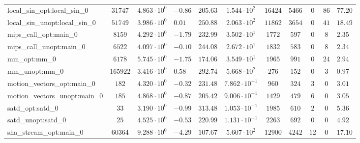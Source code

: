 \begin{tabular}{|l|c|HHc|c|c|c|c|cH|}
local\_sin\_opt:local\_sin\_0                   & $ 31747    $ & $ 4.863 \cdot 10^{0} $ & $ -0.86 $ & $ 205.63 $ & $ 1.544 \cdot 10^{2}  $ & $ 16424  $ & $ 5466  $ & $ 0   $ & $ 86  $ & $ 77.20   $ \\
local\_sin\_unopt:local\_sin\_0                 & $ 51749    $ & $ 3.986 \cdot 10^{0} $ & $ 0.01  $ & $ 250.88 $ & $ 2.063 \cdot 10^{2}  $ & $ 11862  $ & $ 3654  $ & $ 0   $ & $ 41  $ & $ 18.49   $ \\
mips\_call\_opt:main\_0                         & $ 8159     $ & $ 4.292 \cdot 10^{0} $ & $ -1.79 $ & $ 232.99 $ & $ 3.502 \cdot 10^{1}  $ & $ 1772   $ & $ 597   $ & $ 0   $ & $ 8   $ & $ 2.35    $ \\
mips\_call\_unopt:main\_0                       & $ 6522     $ & $ 4.097 \cdot 10^{0} $ & $ -0.10 $ & $ 244.08 $ & $ 2.672 \cdot 10^{1}  $ & $ 1832   $ & $ 583   $ & $ 0   $ & $ 8   $ & $ 2.34    $ \\
mm\_opt:mm\_0                                   & $ 6178     $ & $ 5.745 \cdot 10^{0} $ & $ -1.75 $ & $ 174.06 $ & $ 3.549 \cdot 10^{1}  $ & $ 1965   $ & $ 991   $ & $ 0   $ & $ 24  $ & $ 2.94    $ \\
mm\_unopt:mm\_0                                 & $ 165922   $ & $ 3.416 \cdot 10^{0} $ & $ 0.58  $ & $ 292.74 $ & $ 5.668 \cdot 10^{2}  $ & $ 276    $ & $ 152   $ & $ 0   $ & $ 3   $ & $ 0.97    $ \\
motion\_vectors\_opt:main\_0                    & $ 182      $ & $ 4.320 \cdot 10^{0} $ & $ -0.32 $ & $ 231.48 $ & $ 7.862 \cdot 10^{-1} $ & $ 960    $ & $ 324   $ & $ 3   $ & $ 0   $ & $ 3.01    $ \\
motion\_vectors\_unopt:main\_0                  & $ 185      $ & $ 4.868 \cdot 10^{0} $ & $ -0.87 $ & $ 205.42 $ & $ 9.006 \cdot 10^{-1} $ & $ 1429   $ & $ 479   $ & $ 6   $ & $ 0   $ & $ 3.05    $ \\
satd\_opt:satd\_0                               & $ 33       $ & $ 3.190 \cdot 10^{0} $ & $ -0.99 $ & $ 313.48 $ & $ 1.053 \cdot 10^{-1} $ & $ 1985   $ & $ 610   $ & $ 2   $ & $ 0   $ & $ 5.36    $ \\
satd\_unopt:satd\_0                             & $ 25       $ & $ 4.525 \cdot 10^{0} $ & $ -0.53 $ & $ 220.99 $ & $ 1.131 \cdot 10^{-1} $ & $ 2263   $ & $ 692   $ & $ 0   $ & $ 0   $ & $ 4.92    $ \\
sha\_stream\_opt:main\_0                        & $ 60364    $ & $ 9.288 \cdot 10^{0} $ & $ -4.29 $ & $ 107.67 $ & $ 5.607 \cdot 10^{2}  $ & $ 12900  $ & $ 4242  $ & $ 12  $ & $ 0   $ & $ 17.10   $ \\

\end{tabular}
